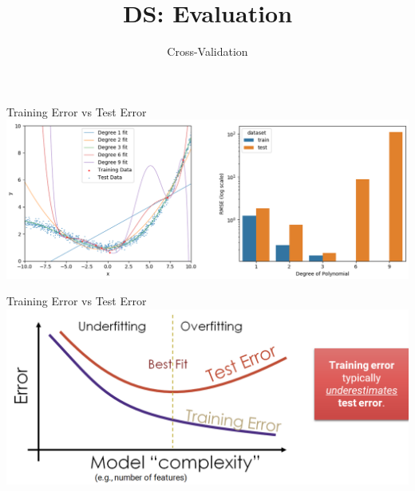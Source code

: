 \documentclass[aspectratio=169]{../latex_main/tntbeamer}  %
\title[CV, Reg \& AutoML]{DS: Evaluation}
\subtitle{Cross-Validation}
\begin{document}
	
	\maketitle
	\begin{frame}{Training Error vs Test Error}
	    \includegraphics[scale=.4]{Bild1}
	\end{frame}
	
	
	\begin{frame}{Training Error vs Test Error}
	    \includegraphics[scale=.4]{Bild2}
	\end{frame}
	
\end{document}
